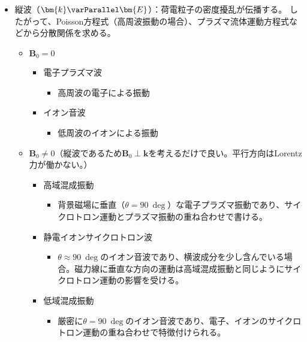 \begin{itemize}
	\item 縦波（$\bm{k}\varParallel \bm{E}$）：{\color{red}荷電粒子の密度擾乱}が伝播する。
	      したがって、{\color{red}Poisson方程式}（高周波振動の場合）、{\color{red}プラズマ流体運動方程式}などから分散関係を求める。
	      \begin{itemize}
		      \item $\bm{B}_0 = 0$
		            \begin{itemize}
			            \item 電子プラズマ波
			                  \begin{itemize}
				                  \item 高周波の電子による振動
			                  \end{itemize}
			            \item イオン音波
			                  \begin{itemize}
				                  \item 低周波のイオンによる振動
			                  \end{itemize}
		            \end{itemize}
		      \item $\bm{B}_0 \neq 0$（縦波であるため$\bm{B}_0\perp\bm{k}$を考えるだけで良い。平行方向はLorentz力が働かない。）
		            \begin{itemize}
			            \item 高域混成振動
			                  \begin{itemize}
				                  \item 背景磁場に垂直（$\theta=\SI{90}{\deg}$）な電子プラズマ振動であり、サイクロトロン運動とプラズマ振動の重ね合わせで書ける。
			                  \end{itemize}
			            \item 静電イオンサイクロトロン波
			                  \begin{itemize}
				                  \item $\theta\approx \SI{90}{\deg}$のイオン音波であり、横波成分を少し含んでいる場合。磁力線に垂直な方向の運動は高域混成振動と同じようにサイクロトロン運動の影響を受ける。
			                  \end{itemize}
			            \item 低域混成振動
			                  \begin{itemize}
				                  \item 厳密に$\theta = \SI{90}{\deg}$のイオン音波であり、電子、イオンのサイクロトロン運動の重ね合わせで特徴付けられる。

\end{itemize}
\end{itemize}
\end{itemize}
\end{itemize}
